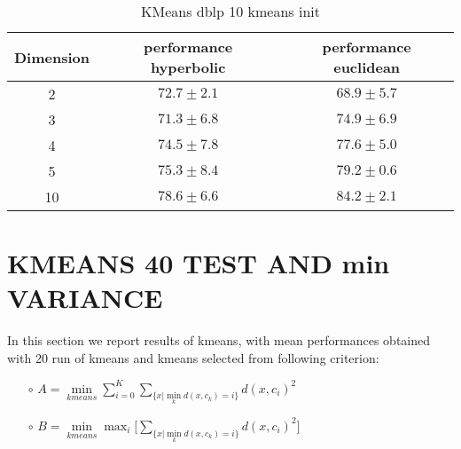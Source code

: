\documentclass{article}
\begin{document}
\begin{table} 
    \centering 
    \begin{tabular}{|c|cc|}
      \hline Dimension & performance hyperbolic & performance euclidean\\ \hline
      2& $72.7 \pm 2.1$ & $68.9 \pm 5.7$\\ \hline
      3& $71.3 \pm 6.8$ & $74.9 \pm 6.9$\\ \hline
      4& $74.5 \pm 7.8$ & $77.6 \pm 5.0$\\ \hline
      5& $75.3 \pm 8.4$ & $79.2 \pm 0.6$\\ \hline
      10& $78.6 \pm 6.6$ & $84.2 \pm 2.1$\\ \hline
  \end{tabular}
  \caption{KMeans dblp 10 kmeans init}
\end{table}

\section{KMEANS 40 TEST AND min VARIANCE}

In this section we report results of kmeans, with mean performances obtained with 20 run of kmeans and kmeans selected from following criterion:

\begin{itemize}
    \item[$\circ$]  $ A = \min\limits_{kmeans} \sum\limits_{i=0}^K \sum\limits_{\{x | \min\limits_k d(x,c_k) = i\}} d(x, c_i)^2$
    \item[$\circ$]  $ B = \min\limits_{kmeans} \max_{i} \Big[ \sum\limits_{\{x | \min\limits_k d(x,c_k) = i\}} d(x, c_i)^2 \Big]$
\end{itemize}
\end{document}

